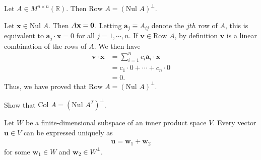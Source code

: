 \documentclass[12pt,letterpaper,reqno]{article}
\numberwithin{equation}{section}
\newcommand{\bv}{\mathbf{v}}
\newcommand{\bw}{\mathbf{w}}
\newcommand{\bu}{\mathbf{u}}
\newcommand{\bx}{\mathbf{x}}
\newcommand{\ba}{\mathbf{a}}
\begin{document}
\begin{prop}
	Let $A \in M^{n \times n}(\mathbb{R})$. Then $\text{Row }A=(\text{Nul }A)^\perp$.
\end{prop}

\begin{pf}
	Let $\bx \in \text{Nul }A$. Then $A\bx = {\bf 0}$. Letting $\ba_j\equiv A_{ij}$ denote the $jth$ row of $A$, this is equivalent to $\ba_j \cdot \bx = 0$ for all $j=1,\cdots, n$. If $\bv \in \text{Row }A$, by definition $\bv$ is a linear combination of the rows of $A$. We then have 
	\begin{align*}
		\bv \cdot \bx &=\sum_{i=1}^nc_i\ba_i \cdot \bx \\
		&=c_1 \cdot 0 + \cdots + c_n \cdot 0 \\
		&=0.
	\end{align*}
Thus, we have proved that $\text{Row }A=(\text{Nul }A)^\perp$.	
\end{pf}

\begin{exercise}
	Show that $\text{Col }A=(\text{Nul }A^T)^\perp$.
\end{exercise}

\begin{thm} 
	Let $W$ be a finite-dimensional subspace of an inner product space $V$. Every vector  $\bu \in V$ can be expressed uniquely as
	\begin{align*}
		\bu = \bw_1 + \bw_2
	\end{align*}
	for some $\bw_1 \in W$ and $\bw_2 \in W^\perp$.
\end{thm}
\end{document}
